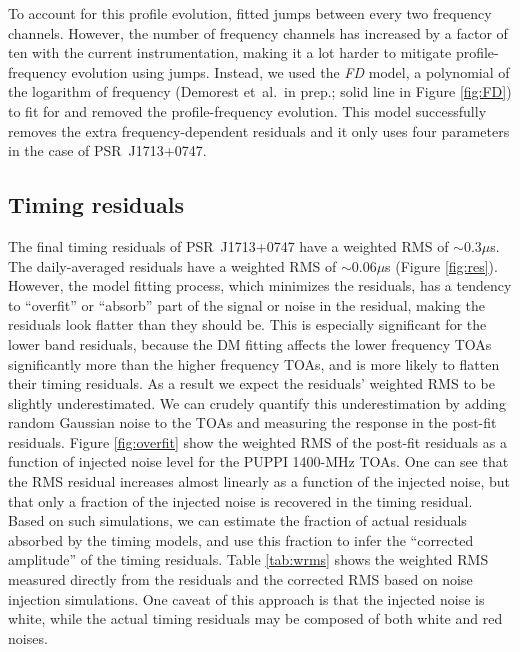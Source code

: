 To account for this profile evolution, \citet{sns+05} fitted jumps
between every two frequency channels. However, the number of frequency
channels has increased by a factor of ten with the current instrumentation, making it a lot harder to mitigate profile-frequency evolution using jumps. 
Instead, we used the {\it FD} model, a polynomial of the logarithm of
frequency (Demorest et~al.\ in prep.; solid line in Figure
\ref{fig:FD}) to fit for and removed the profile-frequency
evolution. This model successfully removes the extra
frequency-dependent residuals and it only uses four parameters in the
case of PSR~J1713+0747.



\subsection{Timing residuals}
\label{sec:res}

The final timing residuals of PSR~J1713+0747 have a weighted RMS of
$\sim 0.3\mu$s. The daily-averaged residuals have a weighted RMS of $\sim 0.06\mu$s (Figure \ref{fig:res}).
However, the model fitting process, which minimizes the residuals, has a tendency to ``overfit'' or 
``absorb'' part of the signal or noise in the residual, making the residuals
look flatter than they should be. 
This is especially significant for the lower band residuals, because
the DM fitting affects the lower frequency TOAs significantly more than the
higher frequency TOAs, and is more likely to flatten their timing residuals. 
As a result we expect the residuals' weighted RMS to be slightly underestimated. We can crudely quantify
this underestimation by adding random Gaussian noise to the TOAs and
measuring the response in the post-fit residuals. Figure \ref{fig:overfit} show
the weighted RMS of the post-fit residuals as a function of injected
noise level for the PUPPI 1400-MHz TOAs. 
One can see that the RMS residual increases almost linearly as a function of the
injected noise, but that only a fraction of the injected noise is
recovered in the timing residual.
Based on such simulations, we
can estimate the fraction of actual residuals absorbed by the timing models, and use this fraction to infer the ``corrected amplitude'' of the timing residuals. 
Table \ref{tab:wrms} shows the weighted RMS measured directly from the residuals 
and the corrected RMS based on noise injection simulations. One caveat 
of this approach is that the injected noise is white, while the actual timing
residuals may be composed of both white and red noises. 


